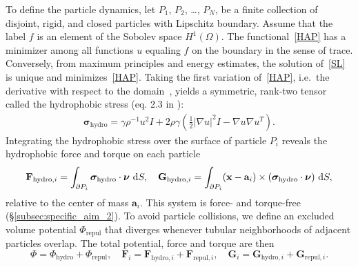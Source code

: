 To define the particle dynamics, let $P_1$, $P_2$, \ldots, $P_N$, be a
finite collection of disjoint, rigid, and closed particles with
Lipschitz boundary. Assume that the label $f$ is an element of the
Sobolev space $H^1(\Omega)$. The functional~\eqref{HAP} has a minimizer
among all functions $u$ equaling $f$ on the boundary in the sense of
trace.  Conversely, from maximum principles and energy estimates, the
solution of~\eqref{SL} is unique and minimizes~\eqref{HAP}. Taking the
first variation of~\eqref{HAP}, i.e.~the derivative with respect to the
domain~\cite{Bandle2015, Schiffer1954, Grinfeld2010}, yields a
symmetric, rank-two tensor called the hydrophobic stress (eq. 2.3 in \cite{Fu2018_SIAM}):
\begin{align}
  \label{stress}
\boldsymbol{\sigma}_{\text{hydro}} = \gamma \rho^{-1} u^2 I + 2\rho \gamma (\tfrac{1}{2}|\nabla u|^2I - \nabla u \nabla u^T).
\end{align}
%
%
Integrating the hydrophobic stress over the surface of particle $P_i$
reveals the hydrophobic force and torque on each particle 
\begin{align}
  \label{forceandtorque}
  \mathbf{F}_{\text{hydro},i} = \int_{\partial P_i} \boldsymbol{\sigma}_{\text{hydro}}
  \cdot \boldsymbol{\nu} \,\dif S,\quad
  \mathbf{G}_{\text{hydro},i} = \int_{\partial P_i} (\mathbf{x}-\mathbf{a}_i) \times
  (\boldsymbol{\sigma}_{\text{hydro}} \cdot \boldsymbol{\nu}) \,\dif S,
\end{align}
relative to the center of mass $\mathbf{a}_i$.  This system is force-
and torque-free (\S\ref{subsec:specific_aim_2}).  To avoid particle
collisions, we define an excluded volume potential $\Phi_{\text{repul}}$
that diverges whenever tubular neighborhoods of adjacent particles
overlap. The total potential,
force and torque are then
\begin{equation}
\label{eq:total_poten}
\Phi = \Phi_{\text{hydro}} + \Phi_{\text{repul}},\quad
\mathbf{F}_{i} = \mathbf{F}_{\text{hydro},i} + \mathbf{F}_{\text{repul},i},\quad
\mathbf{G}_{i} = \mathbf{G}_{\text{hydro},i} + \mathbf{G}_{\text{repul},i}.
\end{equation}


